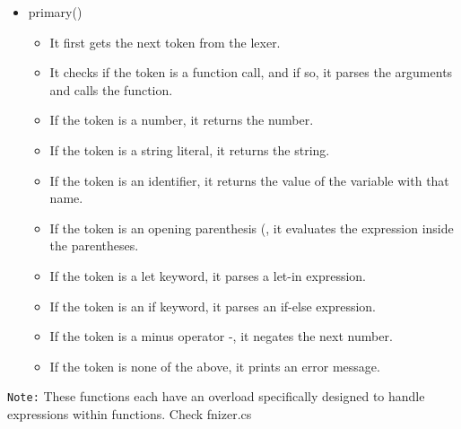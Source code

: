 \begin{itemize}
\begin{itemize}
        \end{itemize}
    \newpage
    \item primary{()}
        \begin{itemize}
            \item It first gets the next token from the lexer.
            \item It checks if the token is a function call, and if so, it parses the arguments and calls the function.
            \item If the token is a number, it returns the number.
            \item If the token is a string literal, it returns the string.
            \item If the token is an identifier, it returns the value of the variable with that name.
            \item If the token is an opening parenthesis (, it evaluates the expression inside the parentheses.
            \item If the token is a let keyword, it parses a let-in expression.
            \item If the token is an if keyword, it parses an if-else expression.
            \item If the token is a minus operator -, it negates the next number.
            \item If the token is none of the above, it prints an error message.
        \end{itemize}
\end{itemize}

\texttt{Note:} These functions each have an overload specifically designed to handle expressions within functions. Check fnizer.cs

